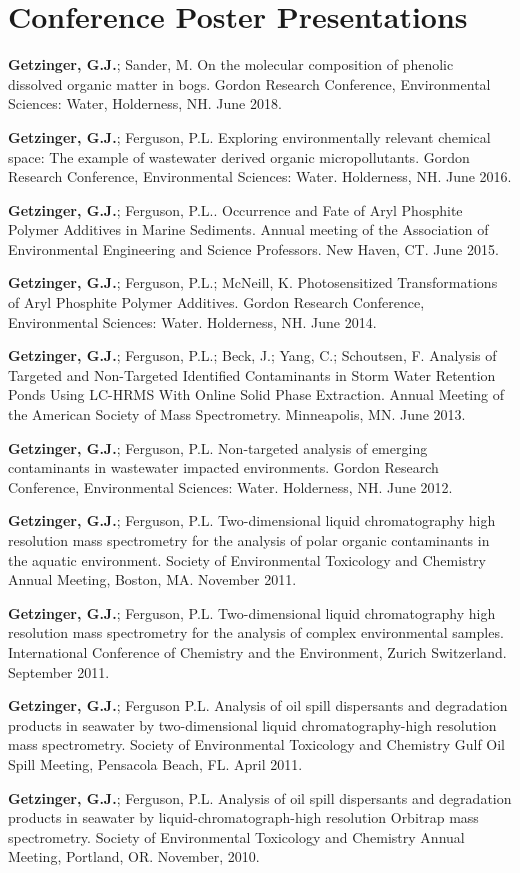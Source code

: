 \documentclass[letterpaper,10pt]{article}
\begin{document}
\section{Conference Poster Presentations}
\begin{etaremune}
\item{}{\bfseries Getzinger, G.J.}; Sander, M. On the molecular composition of phenolic dissolved organic matter in bogs. Gordon Research Conference, Environmental Sciences: Water, Holderness, NH. June 2018. 
%
\item{{\bfseries Getzinger, G.J.}}; Ferguson, P.L. Exploring environmentally relevant chemical space: The example of wastewater derived organic micropollutants. Gordon Research Conference, Environmental Sciences: Water. Holderness, NH. June 2016.
%
\item{\bfseries Getzinger, G.J.}; Ferguson, P.L.. Occurrence and Fate of Aryl Phosphite Polymer Additives in Marine Sediments. Annual meeting of the Association of Environmental Engineering and Science Professors. New Haven, CT. June 2015.
%
\item {\bfseries Getzinger, G.J.}; Ferguson, P.L.; McNeill, K. Photosensitized Transformations of Aryl Phosphite Polymer Additives. Gordon Research Conference, Environmental Sciences: Water. Holderness, NH.  June 2014.
%
\item {\bfseries Getzinger, G.J.}; Ferguson, P.L.; Beck, J.; Yang, C.; Schoutsen, F. Analysis of Targeted and Non-Targeted Identified Contaminants in Storm Water Retention Ponds Using LC-HRMS With Online Solid Phase Extraction. Annual Meeting of the American Society of Mass Spectrometry. Minneapolis, MN. June 2013.
%
\item  {\bfseries Getzinger, G.J.}; Ferguson, P.L. Non-targeted analysis of emerging contaminants in wastewater impacted environments. Gordon Research Conference, Environmental Sciences: Water. Holderness, NH.  June 2012.
%
 \item  {\bfseries Getzinger, G.J.}; Ferguson, P.L. Two-dimensional liquid chromatography high resolution mass spectrometry for the analysis of polar organic contaminants in the aquatic environment. Society of Environmental Toxicology and Chemistry Annual Meeting, Boston, MA. November 2011.
%
 \item {\bfseries Getzinger, G.J.}; Ferguson, P.L. Two-dimensional liquid chromatography high resolution mass spectrometry for the analysis of complex environmental samples. International Conference of Chemistry and the Environment, Zurich Switzerland. September 2011.
%
 \item {\bfseries Getzinger, G.J.}; Ferguson P.L. Analysis of oil spill dispersants and degradation products in seawater by two-dimensional liquid chromatography-high resolution mass spectrometry. Society of Environmental Toxicology and Chemistry Gulf Oil Spill Meeting, Pensacola Beach, FL. April 2011.
%
 \item {\bfseries Getzinger, G.J.}; Ferguson, P.L. Analysis of oil spill dispersants and degradation products in seawater by liquid-chromatograph-high resolution Orbitrap mass spectrometry. Society of Environmental Toxicology and Chemistry Annual Meeting, Portland, OR. November, 2010.
\end{etaremune}
%
\end{document}
